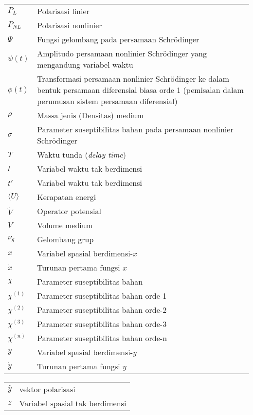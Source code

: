 \begin{center}
\begin{tabular}{lp{}}
    $P_L$ & Polarisasi linier\\
  $P_{NL}$ & Polarisasi nonlinier\\
  $\Psi$ & Fungsi gelombang pada persamaan Schr\"odinger\\
  $\psi(t)$ & Amplitudo persamaan nonlinier Schr\"odinger yang mengandung variabel waktu\\
  $\phi(t)$ & Transformasi persamaan nonlinier Schr\"odinger ke dalam bentuk persamaan diferensial biasa orde 1 (pemisalan dalam perumusan sistem persamaan diferensial)\\
  $\rho$ & Massa jenis (Densitas) medium\\
  $\sigma$ & Parameter suseptibilitas bahan pada persamaan nonlinier Schr\"odinger \\
  $T$ & Waktu tunda (\textit{delay time}) \\
  $t$ & Variabel waktu tak berdimensi \\
  $t'$ & Variabel waktu tak berdimensi \\
  $\langle U\rangle$ & Kerapatan energi \\
  $\tilde{V}$ & Operator potensial \\
  $V$ & Volume medium \\
  $\nu_g$ & Gelombang grup \\
  $x$ & Variabel spasial berdimensi-$x$\\
  $\dot{x}$ & Turunan pertama fungsi $x$ \\
  $\chi$ & Parameter suseptibilitas bahan\\
  $\chi^{(1)}$ & Parameter suseptibilitas bahan orde-1\\
  $\chi^{(2)}$ & Parameter suseptibilitas bahan orde-2\\
  $\chi^{(3)}$ & Parameter suseptibilitas bahan orde-3\\
  $\chi^{(n)}$ & Parameter suseptibilitas bahan orde-n\\
  $y$ & Variabel spasial berdimensi-$y$\\
  $\dot{y}$ & Turunan pertama fungsi $y$\\
  \end{tabular}
\end{center}

\begin{center}
\begin{tabular}{lp{}}
  $\hat{y}$ & vektor polarisasi\\
  $z$ & Variabel spasial tak berdimensi\\
\end{tabular}
\end{center}